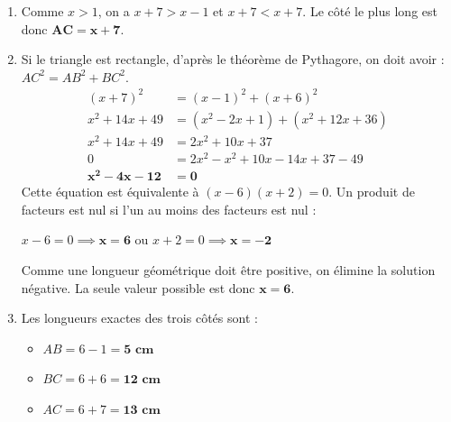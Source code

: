 \documentclass[a4paper]{book}
\begin{document}
    
    \begin{exercice}
        \begin{enumerate}
            \item Comme $x > 1$, on a $x + 7 > x - 1$ et $x + 7 < x + 7$. Le côté le plus long est donc $\mathbf{AC = x + 7}$.
            \item Si le triangle est rectangle, d'après le théorème de Pythagore, on doit avoir : $AC^2 = AB^2 + BC^2$.
            \begin{align*}
                (x + 7)^2 &= (x - 1)^2 + (x + 6)^2 \\
                x^2 + 14x + 49 &= (x^2 - 2x + 1) + (x^2 + 12x + 36) \\
                x^2 + 14x + 49 &= 2x^2 + 10x + 37 \\
                0 &= 2x^2 - x^2 + 10x - 14x + 37 - 49 \\
                \mathbf{x^2 - 4x - 12} &\mathbf{= 0}
            \end{align*}
            Cette équation est équivalente à $(x - 6)(x + 2) = 0$. Un produit de facteurs est nul si l'un au moins des facteurs est nul :
            \begin{center}
                $x - 6 = 0 \implies \mathbf{x = 6}$ \quad ou \quad $x + 2 = 0 \implies \mathbf{x = -2}$
            \end{center}
            Comme une longueur géométrique doit être positive, on élimine la solution négative. La seule valeur possible est donc $\mathbf{x = 6}$.
            \item Les longueurs exactes des trois côtés sont :
            \begin{itemize}
                \item $AB = 6 - 1 = \mathbf{5\text{ cm}}$
                \item $BC = 6 + 6 = \mathbf{12\text{ cm}}$
                \item $AC = 6 + 7 = \mathbf{13\text{ cm}}$
            \end{itemize}
        \end{enumerate}
    \end{exercice}
    
\end{document}
